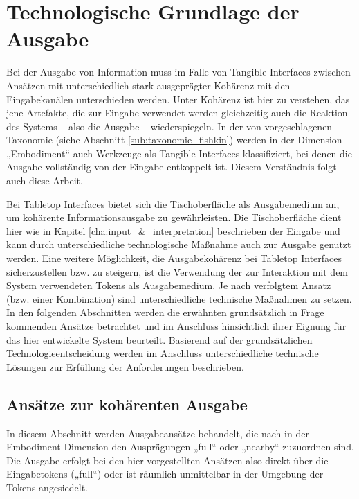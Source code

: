 \section{Technologische Grundlage der Ausgabe} %
\label{sec:technologische_grundlage_der_visualisierung}

Bei der Ausgabe von Information muss im Falle von Tangible Interfaces zwischen Ansätzen mit unterschiedlich stark ausgeprägter Kohärenz mit den Eingabekanälen unterschieden werden. Unter Kohärenz ist hier zu verstehen, das jene Artefakte, die zur Eingabe verwendet werden gleichzeitig auch die Reaktion des Systems -- also die Ausgabe -- wiederspiegeln. In der von \citet{Fishkin04} vorgeschlagenen Taxonomie (siehe Abschnitt \ref{sub:taxonomie_fishkin}) werden in der Dimension „Embodiment“ auch Werkzeuge als Tangible Interfaces klassifiziert, bei denen die Ausgabe vollständig von der Eingabe entkoppelt ist. Diesem Verständnis folgt auch diese Arbeit.

Bei Tabletop Interfaces bietet sich die Tischoberfläche als Ausgabemedium an, um kohärente Informationsausgabe zu gewährleisten. Die Tischoberfläche dient hier wie in Kapitel \ref{cha:input_&_interpretation} beschrieben der Eingabe und kann durch unterschiedliche technologische Maßnahme auch zur Ausgabe genutzt werden. Eine weitere Möglichkeit, die Ausgabekohärenz bei Tabletop Interfaces sicherzustellen bzw. zu steigern, ist die Verwendung der zur Interaktion mit dem System verwendeten Tokens als Ausgabemedium. Je nach verfolgtem Ansatz (bzw. einer Kombination) sind unterschiedliche technische Maßnahmen zu setzen. In den folgenden Abschnitten werden die erwähnten grundsätzlich in Frage kommenden Ansätze betrachtet und im Anschluss hinsichtlich ihrer Eignung für das hier entwickelte System beurteilt. Basierend auf der grundsätzlichen Technologieentscheidung werden im Anschluss unterschiedliche technische Lösungen zur Erfüllung der Anforderungen beschrieben.

\subsection{Ansätze zur kohärenten Ausgabe} %
\label{sub:kohärente_ausgabe}

In diesem Abschnitt werden Ausgabeansätze behandelt, die nach \citep{Fishkin04} in der Embodiment-Dimension den Ausprägungen „full“ oder „nearby“ zuzuordnen sind. Die Ausgabe erfolgt bei den hier vorgestellten Ansätzen also direkt über die Eingabetokens („full“) oder ist räumlich unmittelbar in der Umgebung der Tokens angesiedelt.

